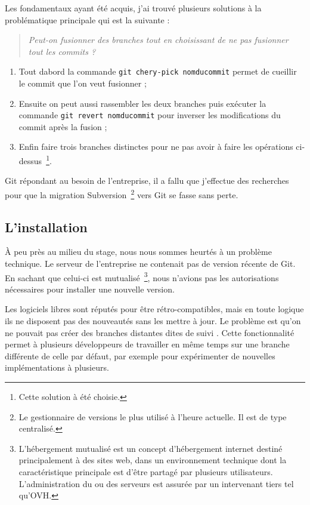 Les fondamentaux ayant été acquis, j'ai trouvé plusieurs solutions à la
problématique principale qui est la suivante :

\begin{quote}
    \emph{Peut-on fusionner des branches tout en choisissant de ne pas
    fusionner tout les commits ?}
\end{quote}

\begin{enumerate}
    \item Tout dabord la commande \texttt{git chery-pick nomducommit}
    permet de \og cueillir \fg{} le commit que l'on veut fusionner ; \item
    Ensuite on peut aussi rassembler les deux branches puis exécuter la
    commande \texttt{git revert nomducommit} pour inverser les modifications
    du commit après la fusion ;
    \item Enfin faire trois branches distinctes pour ne pas avoir à
    faire les opérations ci-dessus\, \footnote{Cette solution à été
    choisie.}.
\end{enumerate}

Git répondant au besoin de l'entreprise, il a fallu que j'effectue des
recherches pour que la migration Subversion\, \footnote{Le gestionnaire
de versions le plus utilisé à l'heure actuelle. Il est de type
centralisé.} vers Git se fasse sans perte.

\subsection{L'installation} %
\label{sub:L'installation}

À peu près au milieu du stage, nous nous sommes heurtés à un problème
technique. Le serveur de l'entreprise ne contenait pas de version
récente de Git. En sachant que celui-ci est mutualisé\,
\footnote{L'hébergement mutualisé est un concept d'hébergement internet
destiné principalement à des sites web, dans un environnement technique
dont la caractéristique principale est d'être partagé par plusieurs
utilisateurs. L'administration du ou des serveurs est assurée par un
intervenant tiers tel qu'OVH.}, nous n'avions pas les autorisations
nécessaires pour installer une nouvelle version.

Les logiciels libres sont réputés pour être rétro-compatibles, mais en
toute logique ils ne disposent pas des nouveautés sans les mettre à jour.
Le problème est qu'on ne pouvait pas créer des branches distantes dites
\og de suivi \fg{}. Cette fonctionnalité permet à plusieurs développeurs
de travailler en même temps sur une branche différente de celle par
défaut, par exemple pour expérimenter de nouvelles implémentations à
plusieurs.

